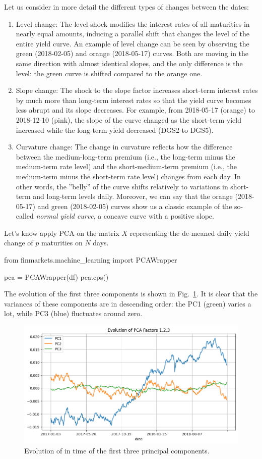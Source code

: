Let us consider in more detail the different types of changes between the dates:
\begin{enumerate}
\item Level change: The level shock modifies the interest rates of all maturities in nearly equal amounts, inducing a parallel shift that changes the level of the entire yield curve. An example of level change can be seen by observing the green (2018-02-05) and orange (2018-05-17) curves. Both are moving in the same direction with almost identical slopes, and the only difference is the level: the green curve is shifted compared to the orange one.
\item Slope change: The shock to the slope factor increases short-term interest rates by much more than long-term interest rates so that the yield curve becomes less abrupt and its slope decreases.
For example, from 2018-05-17 (orange) to 2018-12-10 (pink), the slope of the curve changed as the short-term yield increased while the long-term yield decreased (DGS2 to DGS5).
\item Curvature change: The change in curvature reflects how the difference between the medium-long-term premium (i.e., the long-term minus the medium-term rate level) and the short-medium-term premium (i.e., the medium-term minus the short-term rate level) changes from each day. In other words, the ”belly” of the curve shifts relatively to variations in short-term and long-term levels daily. Moreover, we can say that the orange (2018-05-17) and green (2018-02-05) curves show us a classic example of the so-called \emph{normal yield curve}, a concave curve with a positive slope.
\end{enumerate}

Let's know apply PCA on the matrix $X$ representing the de-meaned daily yield change of $p$ maturities on $N$ days.

\begin{ipython}
from finmarkets.machine_learning import PCAWrapper

pca = PCAWrapper(df)
pca.cps()
\end{ipython}

The evolution of the first three components is shown in Fig.~\ref{fig:pca_evolution_components}. It is clear that the variances of these components are in descending order: the PC1 (green) varies a lot, while PC3 (blue) fluctuates around zero.

\begin{figure}[hbtp]
	\centering
	\includegraphics[width=0.7\linewidth]{figures/pca_evolution_components}
	\caption{Evolution of in time of the first three principal components.}
	\label{fig:pca_evolution_components}
\end{figure}

